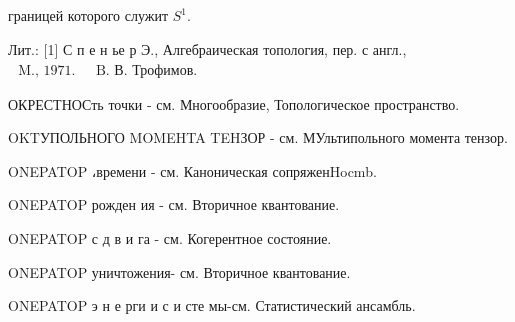 \documentclass[10pt]{article}
\begin{document}
границей которого служит $S^{1}$.



Лит.: [1] С п е н ье р Э., Алгебраическая топология, пер. с англ., $\begin{array}{ll}\text { M., 1971. } & \text { B. В. Трофимов. }\end{array}$



ОКРЕСТНОСть точки - см. Многообразие, Топологическое пространство.



OKTУПОЛЬНОГО MOMEHTA TEHЗОР - см. МУльтипольного момента тензор.



ONEPATOP ،времени - см. Каноническая сопряженHocmb.



ONEPATOP рожден ия - см. Вторичное квантование.



ONEPATOP с д в и га - см. Когерентное состояние.



ONEPATOP уничтожения- см. Вторичное квантование.



ONEPATOP э н е рги и с и сте мы-см. Статистический ансамбль.
\end{document}
